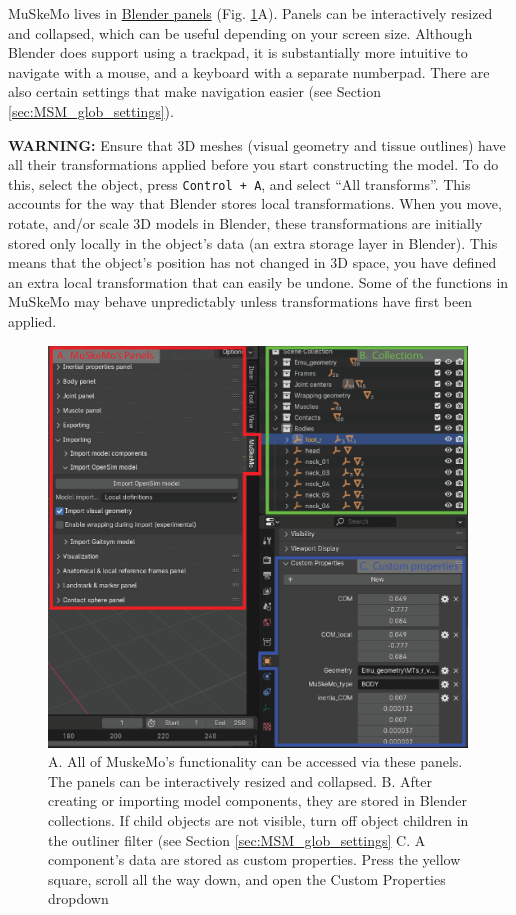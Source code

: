 \documentclass{article}
\begin{document}
MuSkeMo lives in \href{https://docs.blender.org/manual/en/latest/interface/window_system/tabs_panels.html}{Blender panels} (Fig. \ref{fig:MuSkeMoUI}A). Panels can be interactively resized and collapsed, which can be useful depending on your screen size. Although Blender does support using a trackpad, it is substantially more intuitive to navigate with a mouse, and a keyboard with a separate numberpad. There are also certain settings that make navigation easier (see Section \ref{sec:MSM_glob_settings}).


\textbf{WARNING:} Ensure that 3D meshes (visual geometry and tissue outlines) have all their transformations applied before you start constructing the model. To do this, select the object, press \texttt{Control + A}, and select “All transforms”. This accounts for the way that Blender stores local transformations. When you move, rotate, and/or scale 3D models in Blender, these transformations are initially stored only locally in the object’s data (an extra storage layer in Blender). This means that the object’s position has not changed in 3D space, you have defined an extra local transformation that can easily be undone. Some of the functions in MuSkeMo may behave unpredictably unless transformations have first been applied.



\begin{figure}[htbp]
    \centering
    \includegraphics[width=0.99\textwidth]{figures/panels_coll_props.eps} %
    \caption{A. All of MuskeMo's functionality can be accessed via these panels. The panels can be interactively resized and collapsed. B. After creating or importing model components, they are stored in Blender collections. If child objects are not visible, turn off object children in the outliner filter (see Section \ref{sec:MSM_glob_settings} C. A component's data are stored as custom properties. Press the yellow square, scroll all the way down, and open the Custom Properties dropdown}
    \label{fig:MuSkeMoUI}
\end{figure}
\end{document}
